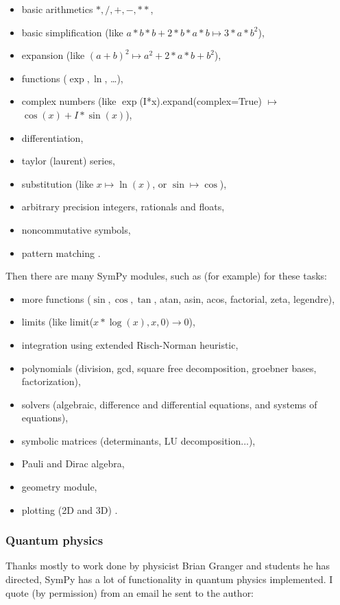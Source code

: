 \documentclass[12pt]{article}
\begin{document}
\begin{itemize}
\item
    basic arithmetics $*,/,+,-,**$,
\item
    basic simplification (like $a*b*b + 2*b*a*b \mapsto 3*a*b^2$),
\item
    expansion (like $(a+b)^2 \mapsto a^2 + 2*a*b + b^2$),
\item
    functions ($\exp, \ln$, \dots),
\item
    complex numbers (like $\exp$(I*x).expand(complex=True) $\mapsto$
    $\cos(x)+I*\sin(x)$),
\item
    differentiation,
\item
    taylor (laurent) series,
\item
    substitution (like $x \mapsto \ln(x)$, or $\sin \mapsto \cos$),
\item
    arbitrary precision integers, rationals and floats,
\item
    noncommutative symbols,
\item
    pattern matching .
\end{itemize}
Then there are many SymPy modules, such as (for example) for these tasks:
\begin{itemize}
\item
    more functions ($\sin, \cos, \tan$, atan, asin, acos, factorial, zeta, legendre),
\item
    limits (like limit($x*\log(x), x, 0) \to 0$),
\item
    integration using extended Risch-Norman heuristic,
\item
    polynomials (division, gcd, square free decomposition, groebner bases, factorization),
\item
    solvers (algebraic, difference and differential equations, and systems of equations),
\item
    symbolic matrices (determinants, LU decomposition...),
\item
  Pauli and Dirac algebra,
\item
    geometry module,
\item
    plotting (2D and 3D) .
\end{itemize}

\subsubsection{Quantum physics}

Thanks mostly to work done by physicist Brian Granger and students
he has directed, SymPy has a lot of functionality in quantum physics
implemented. I quote (by permission) from an email he sent to the author:
\end{document}
